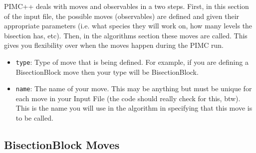 \documentclass{book}
\begin{document}
PIMC++ deals with moves and observables in a two steps. First, in this
section of the input file, the possible moves (observables) are
defined and given their appropriate parameters (i.e. what species they
will work on, how many levels the bisection has, etc).  Then, in the
algorithms section these moves are called.  This gives you flexibility
over when the moves happen during the PIMC run.  

\begin{itemize}
   \item \texttt{type}:  Type of move that is being
   defined.  For example, if you are defining a BisectionBlock move
   then your type will be BisectionBlock.

   \item \texttt{name}:  The name of your move. This may be anything
   but must be unique for each move in your Input File (the code should
   really check for this, btw).  This is the name you will use in the
   algorithm in specifying that this move is to be called.

\end{itemize}

\subsection{BisectionBlock Moves}
 
\end{document}
